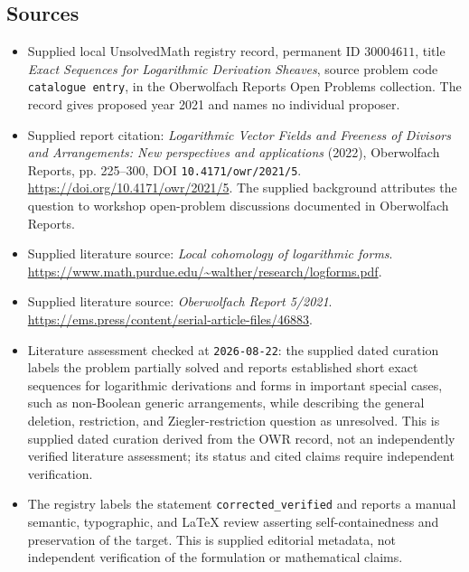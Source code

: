 \documentclass[11pt]{article}
\begin{document}
\subsection{Sources}
\begin{itemize}
\item Supplied local UnsolvedMath registry record, permanent ID \(30004611\), title \emph{Exact Sequences for Logarithmic Derivation Sheaves}, source problem code \texttt{catalogue entry}, in the Oberwolfach Reports Open Problems collection. The record gives proposed year 2021 and names no individual proposer.
\item Supplied report citation: \emph{Logarithmic Vector Fields and Freeness of Divisors and Arrangements: New perspectives and applications} (2022), Oberwolfach Reports, pp. 225--300, DOI \texttt{10.4171/owr/2021/5}. \url{https://doi.org/10.4171/owr/2021/5}. The supplied background attributes the question to workshop open-problem discussions documented in Oberwolfach Reports.
\item Supplied literature source: \emph{Local cohomology of logarithmic forms}. \url{https://www.math.purdue.edu/~walther/research/logforms.pdf}.
\item Supplied literature source: \emph{Oberwolfach Report 5/2021}. \url{https://ems.press/content/serial-article-files/46883}.
\item Literature assessment checked at \texttt{2026-08-22}: the supplied dated curation labels the problem partially solved and reports established short exact sequences for logarithmic derivations and forms in important special cases, such as non-Boolean generic arrangements, while describing the general deletion, restriction, and Ziegler-restriction question as unresolved. This is supplied dated curation derived from the OWR record, not an independently verified literature assessment; its status and cited claims require independent verification.
\item The registry labels the statement \texttt{corrected\_verified} and reports a manual semantic, typographic, and LaTeX review asserting self-containedness and preservation of the target. This is supplied editorial metadata, not independent verification of the formulation or mathematical claims.
\end{itemize}
\end{document}
